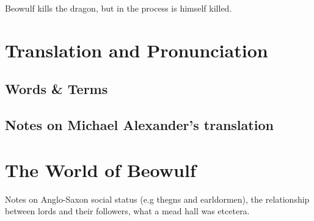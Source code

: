 \documentclass[a4paper]{article}
\begin{document}
Beowulf kills the dragon, but in the process is himself killed.

\section{Translation and Pronunciation}

\subsection{Words \& Terms}%

\subsection{Notes on Michael Alexander's translation}%

\section{The World of Beowulf}

Notes on Anglo-Saxon social status (e.g thegns and earldormen), the relationship
between lords and their followers, what a mead hall was etcetera.
\end{document}
